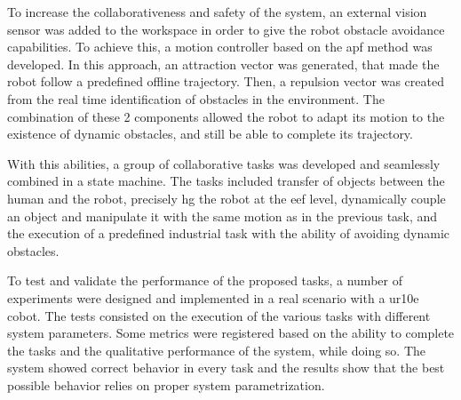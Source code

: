 \par To increase the collaborativeness and safety of the system, an external vision sensor was added to the workspace in order to give the robot obstacle avoidance capabilities. To achieve this, a motion controller based on the \ac{apf} method was developed. In this approach, an attraction vector was generated, that made the robot follow a predefined offline trajectory. Then, a repulsion vector was created from the real time identification of obstacles in the environment. The combination of these 2 components allowed the robot to adapt its motion to the existence of dynamic obstacles, and still be able to complete its trajectory.

\par With this abilities, a group of collaborative tasks was developed and seamlessly combined in a state machine. The tasks included transfer of objects between the human and the robot, precisely \ac{hg} the robot at the \ac{eef} level, dynamically couple an object and manipulate it with the same motion as in the previous task, and the execution of a predefined industrial task with the ability of avoiding dynamic obstacles.

\par To test and validate the performance of the proposed tasks, a number of experiments were designed and implemented in a real scenario with a \ac{ur10e} cobot. The tests consisted on the execution of the various tasks with different system parameters. Some metrics were registered based on the ability to complete the tasks and the qualitative performance of the system, while doing so. The system showed correct behavior in every task and the results show that the best possible behavior relies on proper system parametrization.

